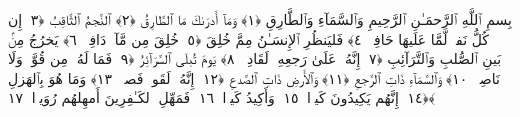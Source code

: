 
  
    
  
    
    

\nopagebreak
  بِسمِ ٱللَّهِ ٱلرَّحمَـٰنِ ٱلرَّحِيمِ
  وَٱلسَّمَآءِ وَٱلطَّارِقِ ﴿١﴾
 وَمَآ أَدرَىٰكَ مَا ٱلطَّارِقُ ﴿٢﴾
 ٱلنَّجمُ ٱلثَّاقِبُ ﴿٣﴾
 إِن كُلُّ نَفسٍۢ لَّمَّا عَلَيهَا حَافِظٌۭ ﴿٤﴾
 فَليَنظُرِ ٱلإِنسَـٰنُ مِمَّ خُلِقَ ﴿٥﴾
 خُلِقَ مِن مَّآءٍۢ دَافِقٍۢ ﴿٦﴾
 يَخرُجُ مِنۢ بَينِ ٱلصُّلبِ وَٱلتَّرَآئِبِ ﴿٧﴾
 إِنَّهُۥ عَلَىٰ رَجعِهِۦ لَقَادِرٌۭ ﴿٨﴾
 يَومَ تُبلَى ٱلسَّرَآئِرُ ﴿٩﴾
 فَمَا لَهُۥ مِن قُوَّةٍۢ وَلَا نَاصِرٍۢ ﴿١٠﴾
 وَٱلسَّمَآءِ ذَاتِ ٱلرَّجعِ ﴿١١﴾
 وَٱلأَرضِ ذَاتِ ٱلصَّدعِ ﴿١٢﴾
 إِنَّهُۥ لَقَولٌۭ فَصلٌۭ ﴿١٣﴾
 وَمَا هُوَ بِٱلهَزلِ ﴿١٤﴾
 إِنَّهُم يَكِيدُونَ كَيدًۭا ﴿١٥﴾
 وَأَكِيدُ كَيدًۭا ﴿١٦﴾
 فَمَهِّلِ ٱلكَـٰفِرِينَ أَمهِلهُم رُوَيدًۢا ﴿١٧﴾
 
